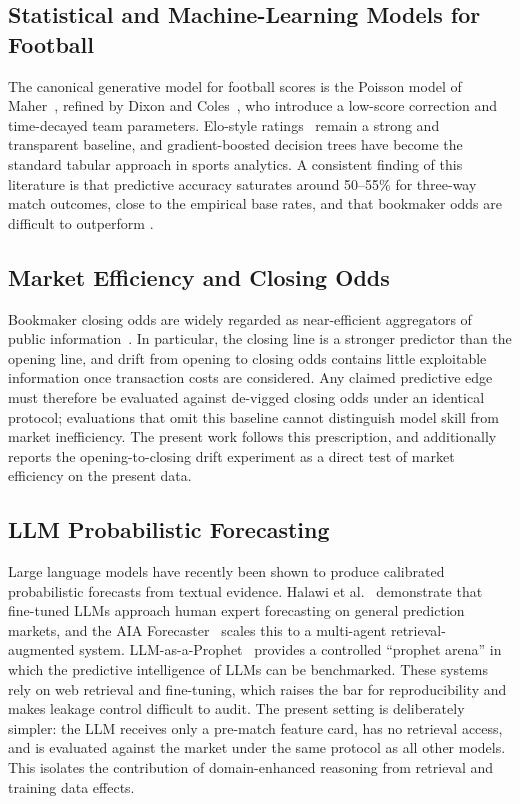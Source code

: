 \label{sec:related}

\subsection{Statistical and Machine-Learning Models for Football}
The canonical generative model for football scores is the Poisson
model of Maher~\citep{maher1982modelling}, refined by
Dixon and Coles~\citep{dixon1997modelling}, who introduce a
low-score correction and time-decayed team parameters. Elo-style
ratings~\citep{elo1978rating} remain a strong and transparent
baseline, and gradient-boosted decision trees have become the
standard tabular approach in sports analytics. A consistent finding
of this literature is that predictive accuracy saturates around
50--55\% for three-way match outcomes, close to the empirical base
rates, and that bookmaker odds are difficult to outperform
\citep{hvattum2010elo, spann2009sports}.

\subsection{Market Efficiency and Closing Odds}
Bookmaker closing odds are widely regarded as near-efficient
aggregators of public information~\citep{levitt2004why, franck2010prediction}.
In particular, the closing line is a stronger predictor than the
opening line, and drift from opening to closing odds contains little
exploitable information once transaction costs are considered. Any
claimed predictive edge must therefore be evaluated against
de-vigged closing odds under an identical protocol; evaluations that
omit this baseline cannot distinguish model skill from market
inefficiency. The present work follows this prescription, and additionally
reports the opening-to-closing drift experiment as a direct test of
market efficiency on the present data.

\subsection{LLM Probabilistic Forecasting}
Large language models have recently been shown to produce calibrated
probabilistic forecasts from textual evidence.
Halawi et al.~\citep{halawi2024approaching} demonstrate that
fine-tuned LLMs approach human expert forecasting on general
prediction markets, and the AIA Forecaster~\citep{alur2025aia}
scales this to a multi-agent retrieval-augmented system.
LLM-as-a-Prophet~\citep{yang2025llm} provides a controlled
``prophet arena'' in which the predictive intelligence of LLMs can be
benchmarked. These systems rely on web retrieval and fine-tuning,
which raises the bar for reproducibility and makes leakage control
difficult to audit. The present setting is deliberately simpler: the LLM
receives only a pre-match feature card, has no retrieval access, and
is evaluated against the market under the same protocol as all other
models. This isolates the contribution of domain-enhanced reasoning
from retrieval and training data effects.

